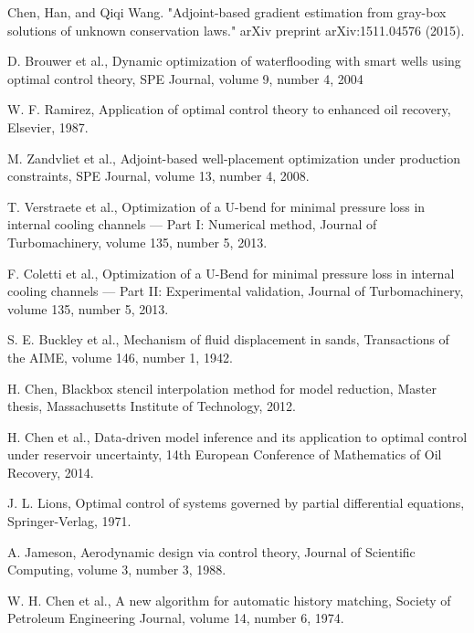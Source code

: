\documentclass[a4paper,onecolumn]{article}
\theoremstyle{remark}
\begin{document}
\begin{thebibliography}{1}
Chen, Han, and Qiqi Wang. 
"Adjoint-based gradient estimation from gray-box solutions of unknown conservation laws." arXiv preprint arXiv:1511.04576 (2015).

D. Brouwer et al.,
Dynamic optimization of waterflooding with smart wells using optimal control theory,
{SPE Journal},
volume 9, number 4, 2004

W. F. Ramirez,
Application of optimal control theory to enhanced oil recovery,
Elsevier, 1987.

M. Zandvliet et al.,
Adjoint-based well-placement optimization under production constraints,
{SPE Journal}, volume 13, number 4, 2008.

T. Verstraete et al., 
Optimization of a U-bend for minimal pressure loss in internal cooling channels — Part I: Numerical method,
{Journal of Turbomachinery},
volume 135, number 5, 2013.

F. Coletti et al.,
Optimization of a U-Bend for minimal pressure loss in internal cooling channels — Part II: Experimental validation,
{Journal of Turbomachinery},
volume 135, number 5, 2013.

S. E. Buckley et al.,
Mechanism of fluid displacement in sands,
{Transactions of the AIME},
volume 146, number 1, 1942.

H. Chen,
Blackbox stencil interpolation method for model reduction,
Master thesis, Massachusetts Institute of Technology, 2012.

H. Chen et al.,
Data-driven model inference and its application to optimal control under reservoir uncertainty,
14th European Conference of Mathematics of Oil Recovery, 2014.

J. L. Lions,
Optimal control of systems governed by partial differential equations,
{Springer-Verlag}, 1971.

A. Jameson,
Aerodynamic design via control theory,
{Journal of Scientific Computing},
volume 3, number 3, 1988.

W. H. Chen et al.,
A new algorithm for automatic history matching,
{Society of Petroleum Engineering Journal},
volume 14, number 6, 1974.


\end{thebibliography}
\end{document}
